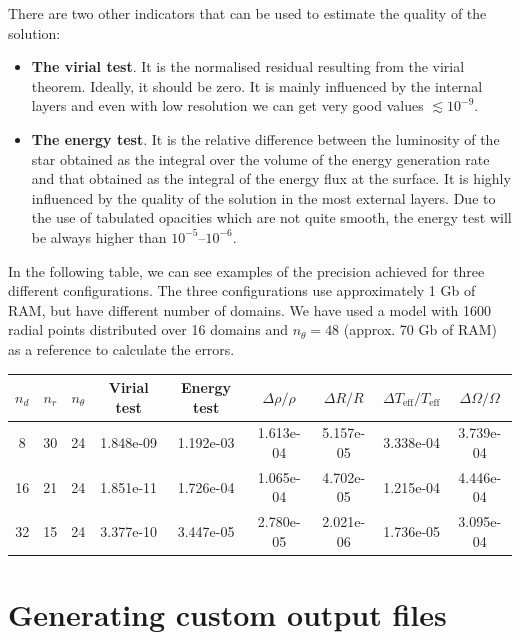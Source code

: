 There are two other indicators that can be used to estimate the quality
of the solution:

\begin{itemize}
\item {\bf The virial test}. It is the normalised residual resulting from
the virial theorem.  Ideally, it should be zero. It is mainly influenced
by the internal layers and even with low resolution we can get very good
values $\lesssim10^{-9}$.

\item {\bf The energy test}. It is the relative difference between
the luminosity of the star obtained as the integral over the volume
of the energy generation rate and that obtained as the integral of the
energy flux at the surface. It is highly influenced by the quality of
the solution in the most external layers. Due to the use of tabulated
opacities which are not quite smooth, the energy test will be always
higher than $10^{-5}$--$10^{-6}$.

\end{itemize}

In the following table, we can see examples of the precision achieved for
three different configurations. The three configurations use approximately
1 Gb of RAM, but have different number of domains. We have used a model
with 1600 radial points distributed over 16 domains and $n_\theta=48$
(approx. 70 Gb of RAM) as a reference to calculate the errors.

\begin{center}
\begin{tabular}{c|c|c||c|c|c|c|c|c}
$n_d$ & $n_r$ & $n_\theta$ & Virial test & Energy test &
$\Delta\rho/\rho$ & $\Delta R/R$ & $\Delta T_\mathrm{eff}/T_\mathrm{eff}$ & $\Delta \Omega/\Omega$ \\
\hline
8 & 30 & 24 & 1.848e-09 & 1.192e-03 & 
1.613e-04 & 5.157e-05 & 3.338e-04 & 3.739e-04 \\
16 & 21 & 24 & 1.851e-11 & 1.726e-04 &
1.065e-04 & 4.702e-05 & 1.215e-04 & 4.446e-04 \\
32 & 15 & 24 & 3.377e-10 & 3.447e-05 &
2.780e-05 & 2.021e-06 & 1.736e-05 & 3.095e-04 \\
\end{tabular}
\end{center}

\section{Generating custom output files}

